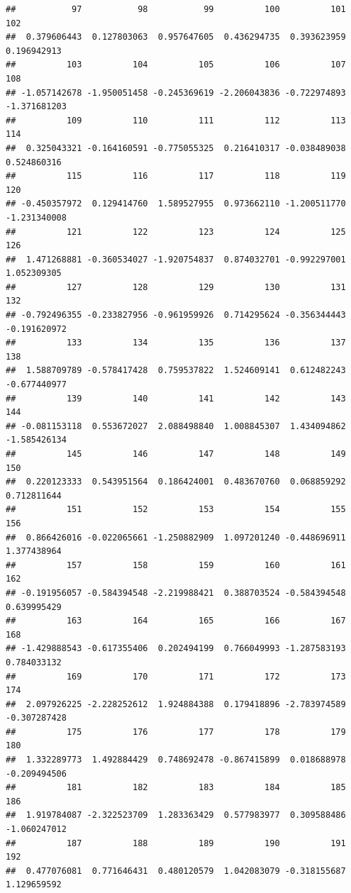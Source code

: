 \documentclass[
]{article}
\begin{document}
\begin{verbatim}
##           97           98           99          100          101          102 
##  0.379606443  0.127803063  0.957647605  0.436294735  0.393623959  0.196942913 
##          103          104          105          106          107          108 
## -1.057142678 -1.950051458 -0.245369619 -2.206043836 -0.722974893 -1.371681203 
##          109          110          111          112          113          114 
##  0.325043321 -0.164160591 -0.775055325  0.216410317 -0.038489038  0.524860316 
##          115          116          117          118          119          120 
## -0.450357972  0.129414760  1.589527955  0.973662110 -1.200511770 -1.231340008 
##          121          122          123          124          125          126 
##  1.471268881 -0.360534027 -1.920754837  0.874032701 -0.992297001  1.052309305 
##          127          128          129          130          131          132 
## -0.792496355 -0.233827956 -0.961959926  0.714295624 -0.356344443 -0.191620972 
##          133          134          135          136          137          138 
##  1.588709789 -0.578417428  0.759537822  1.524609141  0.612482243 -0.677440977 
##          139          140          141          142          143          144 
## -0.081153118  0.553672027  2.088498840  1.008845307  1.434094862 -1.585426134 
##          145          146          147          148          149          150 
##  0.220123333  0.543951564  0.186424001  0.483670760  0.068859292  0.712811644 
##          151          152          153          154          155          156 
##  0.866426016 -0.022065661 -1.250882909  1.097201240 -0.448696911  1.377438964 
##          157          158          159          160          161          162 
## -0.191956057 -0.584394548 -2.219988421  0.388703524 -0.584394548  0.639995429 
##          163          164          165          166          167          168 
## -1.429888543 -0.617355406  0.202494199  0.766049993 -1.287583193  0.784033132 
##          169          170          171          172          173          174 
##  2.097926225 -2.228252612  1.924884388  0.179418896 -2.783974589 -0.307287428 
##          175          176          177          178          179          180 
##  1.332289773  1.492884429  0.748692478 -0.867415899  0.018688978 -0.209494506 
##          181          182          183          184          185          186 
##  1.919784087 -2.322523709  1.283363429  0.577983977  0.309588486 -1.060247012 
##          187          188          189          190          191          192 
##  0.477076081  0.771646431  0.480120579  1.042083079 -0.318155687  1.129659592 

\end{verbatim}
\end{document}

